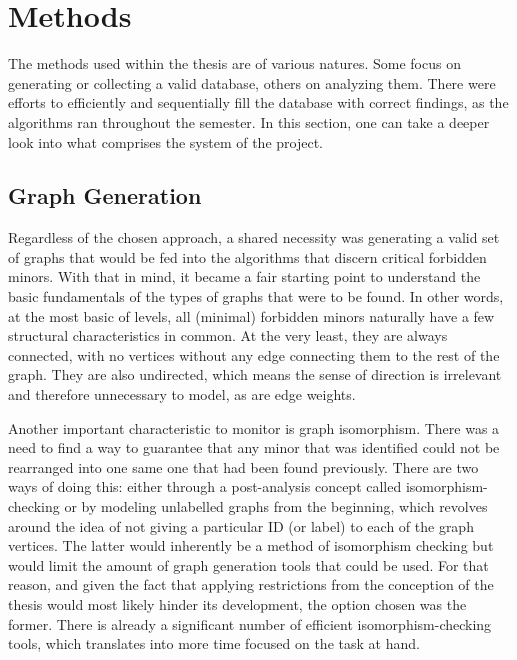 \section{Methods}
The methods used within the thesis are of various natures. Some focus on generating or collecting a valid database, others on analyzing them. There were efforts to efficiently and sequentially fill the database with correct findings, as the algorithms ran throughout the semester. In this section, one can take a deeper look into what comprises the system of the project.

\subsection{Graph Generation}
Regardless of the chosen approach, a shared necessity was generating a valid set of graphs that would be fed into the algorithms that discern critical forbidden minors. With that in mind, it became a fair starting point to understand the basic fundamentals of the types of graphs that were to be found. In other words, at the most basic of levels, all (minimal) forbidden minors naturally have a few structural characteristics in common. At the very least, they are always connected, with no vertices without any edge connecting them to the rest of the graph. They are also undirected, which means the sense of direction is irrelevant and therefore unnecessary to model, as are edge weights.

Another important characteristic to monitor is graph isomorphism. There was a need to find a way to guarantee that any minor that was identified could not be rearranged into one same one that had been found previously. There are two ways of doing this: either through a post-analysis concept called isomorphism-checking or by modeling unlabelled graphs from the beginning, which revolves around the idea of not giving a particular ID (or label) to each of the graph vertices. The latter would inherently be a method of isomorphism checking but would limit the amount of graph generation tools that could be used. For that reason, and given the fact that applying restrictions from the conception of the thesis would most likely hinder its development, the option chosen was the former. There is already a significant number of efficient isomorphism-checking tools, which translates into more time focused on the task at hand.

